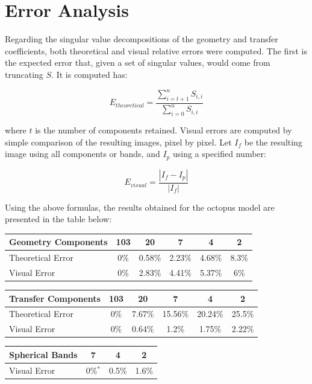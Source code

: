\documentclass[annual]{acmsiggraph}
\begin{document}
\section{Error Analysis}

Regarding the singular value decompositions of the geometry and transfer coefficients, both theoretical and visual relative errors were computed. The first is the expected error that, given a set of singular values, would come from truncating $S$. It is computed has:

\begin{equation}
	E_{theoretical} = \frac {\sum _{i = t+1} ^{n} S_{i,i}} {\sum _{i = 0} ^{n} S_{i,i}}
\end{equation}

where $t$ is the number of components retained. Visual errors are computed by simple comparison of the resulting images, pixel by pixel. Let $I_{f}$ be the resulting image using all components or bands, and $I_{p}$ using a specified number:

\begin{equation}
	E_{visual} = \frac {|I_{f} - I_{p}|} {|I_{f}|}
\end{equation}

Using the above formulas, the results obtained for the octopus model are presented in the table below:

\begin{tabular}{ |l|c|c|c|c|c| }
  \hline
  Geometry Components & 103 & 20 & 7 & 4 & 2 \\
  \hline
  Theoretical Error & 0\% & 0.58\% & 2.23\% & 4.68\% & 8.3\% \\
  Visual Error & 0\% & 2.83\% & 4.41\% & 5.37\% & 6\% \\
  \hline
\end{tabular}

\begin{tabular}{ |l|c|c|c|c|c| }
  \hline
  Transfer Components & 103 & 20 & 7 & 4 & 2 \\
  \hline
  Theoretical Error & 0\% & 7.67\% & 15.56\% & 20.24\% & 25.5\% \\
  Visual Error & 0\% & 0.64\% & 1.2\% & 1.75\% & 2.22\% \\
  \hline
\end{tabular}

\begin{tabular}{ |l|c|c|c| }
  \hline
  Spherical Bands & 7 & 4 & 2 \\
  \hline
  Visual Error & 0\%$^{*}$ & 0.5\% & 1.6\% \\
  \hline
\end{tabular}
\end{document}
